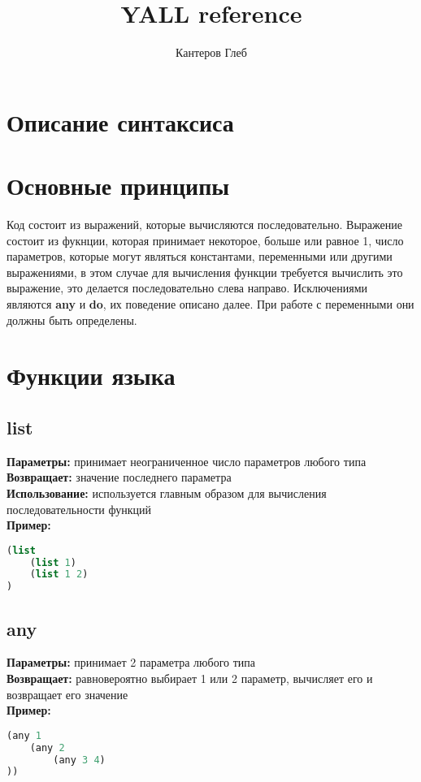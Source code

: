 \documentclass[a4paper,12pt,oneside]{article}
\author{Кантеров Глеб}
\title{YALL reference}
\begin{document}
\begin{titlepage}
\end{titlepage}

\tableofcontents
\newpage

\section{Описание синтаксиса}


\section{Основные принципы}

Код состоит из выражений, которые вычисляются последовательно. Выражение состоит из фукнции, 
которая принимает некоторое, больше или равное 1, число параметров, которые могут являться
константами, переменными или другими выражениями, в этом случае для вычисления функции требуется
вычислить это выражение, это делается последовательно слева направо. Исключениями являются 
\textbf{any} и \textbf{do}, их поведение описано далее. При работе с переменными они должны 
быть определены.

\section{Функции языка}

\subsection{list}
\textbf{Параметры:} принимает неограниченное число параметров любого типа \\
\textbf{Возвращает:} значение последнего параметра \\
\textbf{Использование:} используется главным образом для вычисления последовательности функций \\
\textbf{Пример:} 
\begin{lstlisting}[language=lisp]
(list 
    (list 1) 
    (list 1 2)
) 
\end{lstlisting}

\subsection{any}
\textbf{Параметры:} принимает 2 параметра любого типа \\
\textbf{Возвращает:} равновероятно выбирает 1 или 2 параметр, вычисляет его и возвращает его значение \\
\textbf{Пример:} 
\begin{lstlisting}[language=lisp]
(any 1 
    (any 2 
        (any 3 4)
))
\end{lstlisting}
\end{document}
